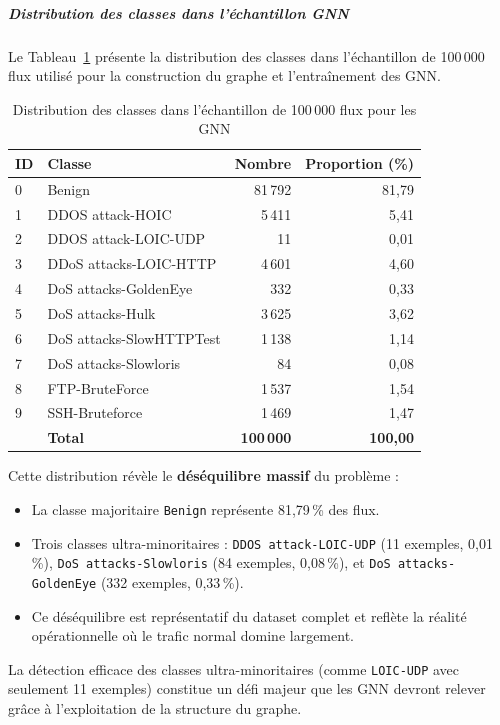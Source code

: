 ﻿\documentclass[11pt,a4paper]{article}
\begin{document}
\subparagraph{Distribution des classes dans l'échantillon GNN}

Le Tableau~\ref{tab:distribution_gnn} présente la distribution des classes dans l'échantillon de 100\,000 flux utilisé pour la construction du graphe et l'entraînement des GNN.

\begin{table}[htbp]
\centering
\small
\caption{Distribution des classes dans l'échantillon de 100\,000 flux pour les GNN}
\label{tab:distribution_gnn}
\begin{tabular}{llrr}
\toprule
\textbf{ID} & \textbf{Classe} & \textbf{Nombre} & \textbf{Proportion (\%)} \\
\midrule
0 & Benign & 81\,792 & 81,79 \\
1 & DDOS attack-HOIC & 5\,411 & 5,41 \\
2 & DDOS attack-LOIC-UDP & 11 & 0,01 \\
3 & DDoS attacks-LOIC-HTTP & 4\,601 & 4,60 \\
4 & DoS attacks-GoldenEye & 332 & 0,33 \\
5 & DoS attacks-Hulk & 3\,625 & 3,62 \\
6 & DoS attacks-SlowHTTPTest & 1\,138 & 1,14 \\
7 & DoS attacks-Slowloris & 84 & 0,08 \\
8 & FTP-BruteForce & 1\,537 & 1,54 \\
9 & SSH-Bruteforce & 1\,469 & 1,47 \\
\midrule
& \textbf{Total} & \textbf{100\,000} & \textbf{100,00} \\
\bottomrule
\end{tabular}
\end{table}

Cette distribution révèle le \textbf{déséquilibre massif} du problème :
\begin{itemize}
    \item La classe majoritaire \texttt{Benign} représente 81,79\,\% des flux.
    \item Trois classes ultra-minoritaires : \texttt{DDOS attack-LOIC-UDP} (11 exemples, 0,01\,\%), \texttt{DoS attacks-Slowloris} (84 exemples, 0,08\,\%), et \texttt{DoS attacks-GoldenEye} (332 exemples, 0,33\,\%).
    \item Ce déséquilibre est représentatif du dataset complet et reflète la réalité opérationnelle où le trafic normal domine largement.
\end{itemize}

La détection efficace des classes ultra-minoritaires (comme \texttt{LOIC-UDP} avec seulement 11 exemples) constitue un défi majeur que les GNN devront relever grâce à l'exploitation de la structure du graphe.
\end{document}
